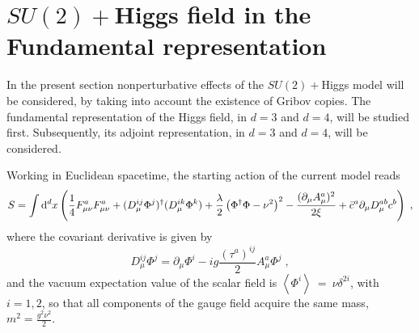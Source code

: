 

\section{$SU(2) +$Higgs field in the Fundamental representation}

In the present section nonperturbative effects of the $SU(2)+$Higgs model will be considered, by taking into account the existence of Gribov copies. The fundamental representation of the Higgs field, in $d=3$ and $d=4$, will be studied first. Subsequently, its adjoint representation, in $d=3$ and $d=4$, will be considered.

Working in Euclidean spacetime, the starting action of the current model reads
\begin{equation}
S=\int \mathrm{d}^{d}x\left(\frac{1}{4}F_{\mu \nu }^{a}F_{\mu \nu }^{a}+
(D_{\mu }^{ij}\Phi ^{j})^{\dagger}( D_{\mu }^{ik}\Phi ^{k})+\frac{\lambda }{2}\left(
\Phi ^{\dagger}\Phi-\nu ^{2}\right) ^{2} - \frac{(\partial _{\mu }A_{\mu}^{a})^{2}}{2\xi} +\bar{c}^{a}\partial _{\mu }D_{\mu }^{ab}c^{b}\right)  \;, 
\label{SYMhiggs}
\end{equation}
where the covariant derivative is given by
\begin{equation}
D_{\mu }^{ij}\Phi^{j} =\partial _{\mu }\Phi^{i} -ig \frac{(\tau^a)^{ij}}{2}A_{\mu }^{a}\Phi^{j} \;,
\end{equation}
and the vacuum expectation value of the scalar field is $\left\langle \Phi^{i} \right\rangle ~=~ \nu\delta^{2i} $, with $i=1,2$,
so that all components of the gauge field acquire the same mass, $m^2= \frac{g^2\nu^2}{2}$.

